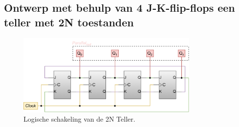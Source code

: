 \documentclass[12pt]{article}
\begin{document}
\subsection{Ontwerp met behulp van 4 J-K-flip-flops een teller met 2N toestanden}
\begin{figure}[h]
    \centering
    \includegraphics[width=0.8\textwidth]{john.png}
    \caption{Logische schakeling van de 2N Teller.}
    \label{fig:john}
\end{figure} 
\end{document}
